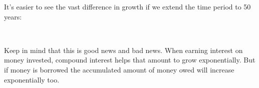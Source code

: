 It’s easier to see the vast difference in growth if we extend the time period to 50 years:
\begin{figure}[H]
    \begin{center}
\\
	\label{FG:fig:SI10}
    \end{center}
\end{figure}


Keep in mind that this is good news and bad news. When earning interest on money invested, compound interest helps that amount to grow exponentially. But if money is borrowed the accumulated amount of money owed will increase exponentially too.


